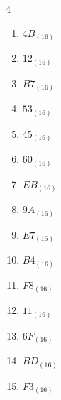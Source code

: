 \begin{multicols}{4}
\begin{enumerate}
        \phantom{$=206$}

  \item $4B_{(16)}$

        \phantom{$=75$}

  \item $12_{(16)}$

        \phantom{$=18$}

  \item $B7_{(16)}$

        \phantom{$=183$}

  \item $53_{(16)}$

        \phantom{$=83$}

  \item $45_{(16)}$

        \phantom{$=69$}

  \item $60_{(16)}$

        \phantom{$=96$}

  \item $EB_{(16)}$

        \phantom{$=235$}

  \item $9A_{(16)}$

        \phantom{$=154$}

  \item $E7_{(16)}$

        \phantom{$=231$}

  \item $B4_{(16)}$

        \phantom{$=180$}

  \item $F8_{(16)}$

        \phantom{$=248$}

  \item $11_{(16)}$

        \phantom{$=17$}

  \item $6F_{(16)}$

        \phantom{$=111$}

  \item $BD_{(16)}$

        \phantom{$=189$}

\columnbreak %

  \item $F3_{(16)}$

        \phantom{$=243$}


\end{enumerate}
\end{multicols}
